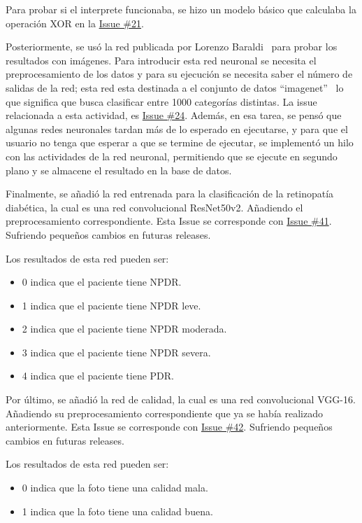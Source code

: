 Para probar si el interprete funcionaba, se hizo un modelo básico que calculaba la operación XOR en la \href{https://github.com/mfg1014/Retinopatia-diabetica/issues/21}{Issue \#21}.

Posteriormente, se usó la red publicada por Lorenzo Baraldi~\cite{github-vgg16} para probar los resultados con imágenes. Para introducir esta red neuronal se necesita el preprocesamiento de los datos y para su ejecución se necesita saber el número de salidas de la red; esta red esta destinada a el conjunto de datos ``imagenet''~\cite{github-imagenet-classes} lo que significa que busca clasificar entre 1000 categorías distintas.
La issue relacionada a esta actividad, es \href{https://github.com/mfg1014/Retinopatia-diabetica/issues/24}{Issue \#24}.
Además, en esa tarea, se pensó que algunas redes neuronales tardan más de lo esperado en ejecutarse, y para que el usuario no tenga que esperar a que se termine de ejecutar, se implementó un hilo con las actividades de la red neuronal, permitiendo que se ejecute en segundo plano y se almacene el resultado en la base de datos.

Finalmente, se añadió la red entrenada para la clasificación de la retinopatía diabética, la cual es una red convolucional ResNet50v2. Añadiendo el preprocesamiento correspondiente. Esta Issue se corresponde con \href{https://github.com/mfg1014/Retinopatia-diabetica/issues/41}{Issue \#41}. Sufriendo pequeños cambios en futuras releases. 

Los resultados de esta red pueden ser:

\begin{itemize}
    \item 0 indica que el paciente tiene NPDR.
    \item 1 indica que el paciente tiene NPDR leve.
    \item 2 indica que el paciente tiene NPDR moderada.
    \item 3 indica que el paciente tiene NPDR severa.
    \item 4 indica que el paciente tiene PDR.
\end{itemize}

Por último, se añadió la red de calidad, la cual es una red convolucional VGG-16. Añadiendo su preprocesamiento correspondiente que ya se había realizado anteriormente. Esta Issue se corresponde con \href{https://github.com/mfg1014/Retinopatia-diabetica/issues/42}{Issue \#42}. Sufriendo pequeños cambios en futuras releases. 

Los resultados de esta red pueden ser:

\begin{itemize}
    \item 0 indica que la foto tiene una calidad mala.
    \item 1 indica que la foto tiene una calidad buena.

\end{itemize}